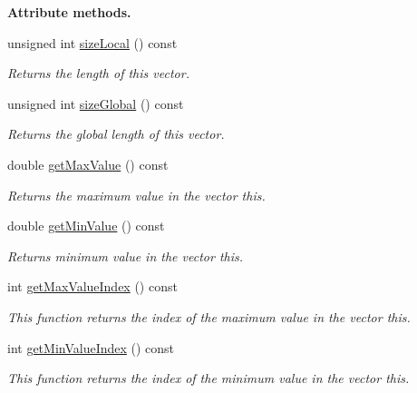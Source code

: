 \begin{Indent}{\bf Attribute methods.}\par
\begin{DoxyCompactItemize}
\item 
unsigned int \hyperlink{class_q_u_e_s_o_1_1_gsl_vector_ace6fb1739b7cf6456b3dcde84c766fb3}{size\-Local} () const 
\begin{DoxyCompactList}\small\item\em Returns the length of this vector. \end{DoxyCompactList}\item 
unsigned int \hyperlink{class_q_u_e_s_o_1_1_gsl_vector_aaaf58e9e980ce006ea4d2b7f69eb6111}{size\-Global} () const 
\begin{DoxyCompactList}\small\item\em Returns the global length of this vector. \end{DoxyCompactList}\item 
double \hyperlink{class_q_u_e_s_o_1_1_gsl_vector_ad25b83a4bbb41d40a38b674df03e5d37}{get\-Max\-Value} () const 
\begin{DoxyCompactList}\small\item\em Returns the maximum value in the vector {\ttfamily this}. \end{DoxyCompactList}\item 
double \hyperlink{class_q_u_e_s_o_1_1_gsl_vector_a77a9a42edfc1e1500ed8a31373245b9d}{get\-Min\-Value} () const 
\begin{DoxyCompactList}\small\item\em Returns minimum value in the vector {\ttfamily this}. \end{DoxyCompactList}\item 
int \hyperlink{class_q_u_e_s_o_1_1_gsl_vector_af27edfee48c38ffcead1bded550da0fc}{get\-Max\-Value\-Index} () const 
\begin{DoxyCompactList}\small\item\em This function returns the index of the maximum value in the vector {\ttfamily this}. \end{DoxyCompactList}\item 
int \hyperlink{class_q_u_e_s_o_1_1_gsl_vector_acb36ad4f7a2185a7abadf6b2261d1ab4}{get\-Min\-Value\-Index} () const 
\begin{DoxyCompactList}\small\item\em This function returns the index of the minimum value in the vector {\ttfamily this}. \end{DoxyCompactList}\item 

\end{DoxyCompactItemize}
\end{Indent}
